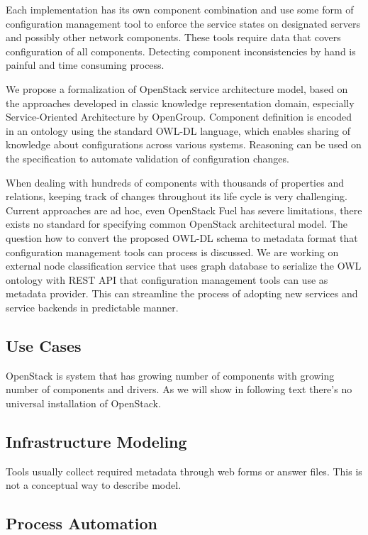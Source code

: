 Each implementation has its own component combination and use some form of configuration management tool to enforce the service states on designated servers and possibly other network components. These tools require data that covers configuration of all components. Detecting component inconsistencies by hand is painful and time consuming process.

We propose a formalization of OpenStack service architecture model, based on the approaches developed in classic knowledge representation domain, especially Service-Oriented Architecture by OpenGroup. Component definition is encoded in an ontology using the standard OWL-DL language, which enables sharing of knowledge about configurations across various systems. Reasoning can be used on the specification to automate validation of configuration changes.

When dealing with hundreds of components with thousands of properties and relations, keeping track of changes throughout its life cycle is very challenging. Current approaches are ad hoc, even OpenStack Fuel has severe limitations, there exists no standard for specifying common OpenStack architectural model. The question how to convert the proposed OWL-DL schema to metadata format that configuration management tools can process is discussed. We are working on external node classification service that uses graph database to serialize the OWL ontology with REST API that configuration management tools can use as metadata provider. This can streamline the process of adopting new services and service backends in predictable manner.

\subsection{Use Cases}

OpenStack is system that has growing number of components with growing number of components and drivers. As we will show in following text there's no universal installation of OpenStack.  


\subsection{Infrastructure Modeling}

Tools usually collect required metadata through web forms or answer files. This is not a conceptual way to describe model.


\subsection{Process Automation}


